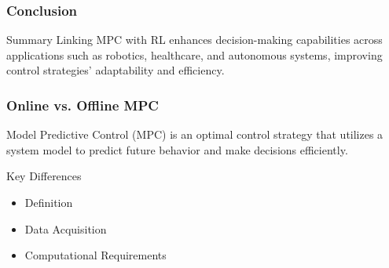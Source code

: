 \documentclass[aspectratio=169]{beamer}
\begin{document}
\begin{frame}[fragile]
    \frametitle{Conclusion}
    \begin{block}{Summary}
        Linking MPC with RL enhances decision-making capabilities across applications such as robotics, healthcare, and autonomous systems, improving control strategies' adaptability and efficiency.
    \end{block}
\end{frame}

\begin{frame}[fragile]
    \frametitle{Online vs. Offline MPC}
    Model Predictive Control (MPC) is an optimal control strategy that utilizes a system model to predict future behavior and make decisions efficiently. 
    
    \begin{block}{Key Differences}
        \begin{itemize}
            \item Definition
            \item Data Acquisition
            \item Computational Requirements
        \end{itemize}
    \end{block}
\end{frame}
\end{document}
